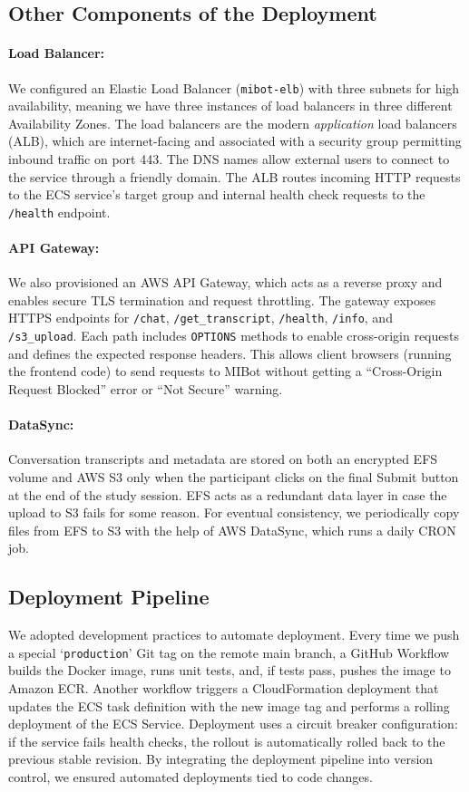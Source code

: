 \subsection{Other Components of the Deployment}

\paragraph{Load Balancer:}We configured an Elastic Load Balancer (\texttt{mibot‐elb}) with three subnets for high availability, meaning we have three instances of load balancers in three different Availability Zones. The load balancers are the modern \emph{application} load balancers (ALB), which are internet-facing and associated with a security group permitting inbound traffic on port 443. The DNS names allow external users to connect to the service through a friendly domain. The ALB routes incoming HTTP requests to the ECS service's target group and internal health check requests to the \texttt{/health} endpoint.

\paragraph{API Gateway:}We also provisioned an AWS API Gateway, which acts as a reverse proxy and enables secure TLS termination and request throttling. The gateway exposes HTTPS endpoints for \texttt{/chat}, \texttt{/get\_transcript}, \texttt{/health}, \texttt{/info}, and \texttt{/s3\_upload}. Each path includes \texttt{OPTIONS} methods to enable cross-origin requests and defines the expected response headers. This allows client browsers (running the frontend code) to send requests to MIBot without getting a ``Cross-Origin Request Blocked'' error or ``Not Secure'' warning.

\paragraph{DataSync:}Conversation transcripts and metadata are stored on both an encrypted EFS volume and AWS S3 only when the participant clicks on the final Submit button at the end of the study session. EFS acts as a redundant data layer in case the upload to S3 fails for some reason. For eventual consistency, we periodically copy files from EFS to S3 with the help of AWS DataSync, which runs a daily CRON job.

\subsection{Deployment Pipeline}
We adopted development practices to automate deployment. Every time we push a special `\texttt{production}' Git tag on the remote main branch, a GitHub Workflow builds the Docker image, runs unit tests, and, if tests pass, pushes the image to Amazon ECR. Another workflow triggers a CloudFormation deployment that updates the ECS task definition with the new image tag and performs a rolling deployment of the ECS Service. Deployment uses a circuit breaker configuration: if the service fails health checks, the rollout is automatically rolled back to the previous stable revision. By integrating the deployment pipeline into version control, we ensured automated deployments tied to code changes.
